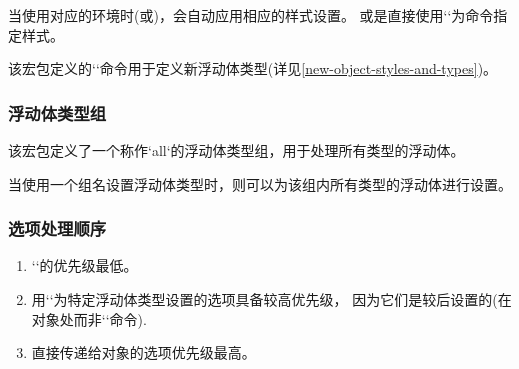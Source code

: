 当使用对应的环境时(或)，会自动应用相应的样式设置。
或是直接使用``为命令指定样式。

该宏包定义的`\NewObjectStyle`命令用于定义新浮动体类型(详见\cref{new-object-styles-and-types})。

\subsubsection{浮动体类型组}
\label{style-groups}

该宏包定义了一个称作`all`的浮动体类型组，用于处理所有类型的浮动体。

当使用一个组名设置浮动体类型时，则可以为该组内所有类型的浮动体进行设置。

\subsubsection{选项处理顺序}
\label{options-processing-order}

\begin{enumerate}
\item ``的优先级最低。
\item 用``为特定浮动体类型设置的选项具备较高优先级，
        因为它们是较后设置的(在对象处而非`\objectset`命令).
\item 直接传递给对象的选项优先级最高。
\end{enumerate}

